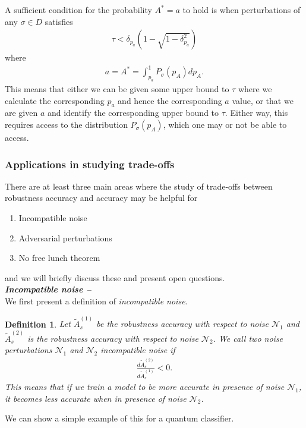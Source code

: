 \documentclass[onecolumn,prx, superscriptaddress,longbibliography,margin=1mm 11pt]{revtex4-2}
\newtheorem{definition}[theorem]{Definition}
\begin{document}
A sufficient condition for the probability $A^*=a$ to hold is when perturbations of any $\sigma \in D$ satisfies 
\begin{align}
    \tau<\delta_{p_a}(1-\sqrt{1-\delta^2_{p_a}})
\end{align}
where 
\begin{align}
    a=A^*=\int^1_{p_a} P_{\sigma}(p_A) dp_A.
\end{align}
This means that either we can be given some upper bound to $\tau$ where we calculate the corresponding $p_a$ and hence the corresponding $a$ value, or that we are given $a$ and identify the corresponding upper bound to $\tau$. Either way, this requires access to the distribution $P_{\sigma}(p_A)$, which one may or not be able to access. 
\subsubsection{Applications in studying trade-offs}
There are at least three main areas where the study of trade-offs between robustness accuracy and accuracy may be helpful for
\begin{enumerate}
    \item Incompatible noise
    \item Adversarial perturbations
    \item No free lunch theorem
\end{enumerate}
and we will briefly discuss these and present open questions. \\

\noindent \textbf{\textit{Incompatible noise --}}\\

\noindent We first present a definition of \textit{incompatible noise}. 
\begin{definition}
        Let $\tilde{A}^{(1)}_s$ be the robustness accuracy with respect to noise $\mathcal{N}_1$ and $\tilde{A}^{(2)}_s$ is the robustness accuracy with respect to noise $\mathcal{N}_2$. We call two noise perturbations  $\mathcal{N}_1$ and $\mathcal{N}_2$ \textit{incompatible noise} if 
\begin{align}
    \frac{d \tilde{A}^{(2)}_s}{d\tilde{A}^{(1)}_s}<0.
\end{align}
This means that if we train a model to be more accurate in presence of noise $\mathcal{N}_1$, it becomes less accurate when in presence of noise $\mathcal{N}_2$. 
\end{definition}
We can show a simple example of this for a quantum classifier. \\
\end{document}
